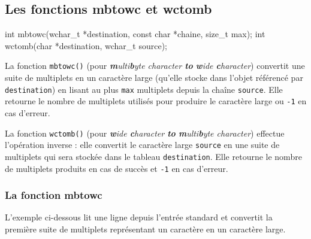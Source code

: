 \documentclass[]{article}
\newenvironment{Shaded}{}{}
\newcommand{\DataTypeTok}[1]{\textcolor[rgb]{0.56,0.13,0.00}{{#1}}}
\newcommand{\NormalTok}[1]{{#1}}
\begin{document}
\subsection{Les fonctions mbtowc et
wctomb}\label{les-fonctions-mbtowc-et-wctomb}

\begin{Shaded}
\begin{Highlighting}[]
\DataTypeTok{int} \NormalTok{mbtowc(}\DataTypeTok{wchar_t} \NormalTok{*destination, }\DataTypeTok{const} \DataTypeTok{char} \NormalTok{*chaine, }\DataTypeTok{size_t} \NormalTok{max);}
\DataTypeTok{int} \NormalTok{wctomb(}\DataTypeTok{char} \NormalTok{*destination, }\DataTypeTok{wchar_t} \NormalTok{source);}
\end{Highlighting}
\end{Shaded}

La fonction \texttt{mbtowc()} (pour \emph{\textbf{m}ulti\textbf{b}yte
character \textbf{to} \textbf{w}ide \textbf{c}haracter}) convertit une
suite de multiplets en un caractère large (qu'elle stocke dans l'objet
référencé par \texttt{destination}) en lisant au plus \texttt{max}
multiplets depuis la chaîne \texttt{source}. Elle retourne le nombre de
multiplets utilisés pour produire le caractère large ou \texttt{-1} en
cas d'erreur.

La fonction \texttt{wctomb()} (pour \emph{\textbf{w}ide
\textbf{c}haracter \textbf{to} \textbf{m}ulti\textbf{b}yte character})
effectue l'opération inverse : elle convertit le caractère large
\texttt{source} en une suite de multiplets qui sera stockée dans le
tableau \texttt{destination}. Elle retourne le nombre de multiplets
produits en cas de succès et \texttt{-1} en cas d'erreur.

\subsubsection{La fonction mbtowc}\label{la-fonction-mbtowc}

L'exemple ci-dessous lit une ligne depuis l'entrée standard et convertit
la première suite de multiplets représentant un caractère en un
caractère large.
\end{document}
